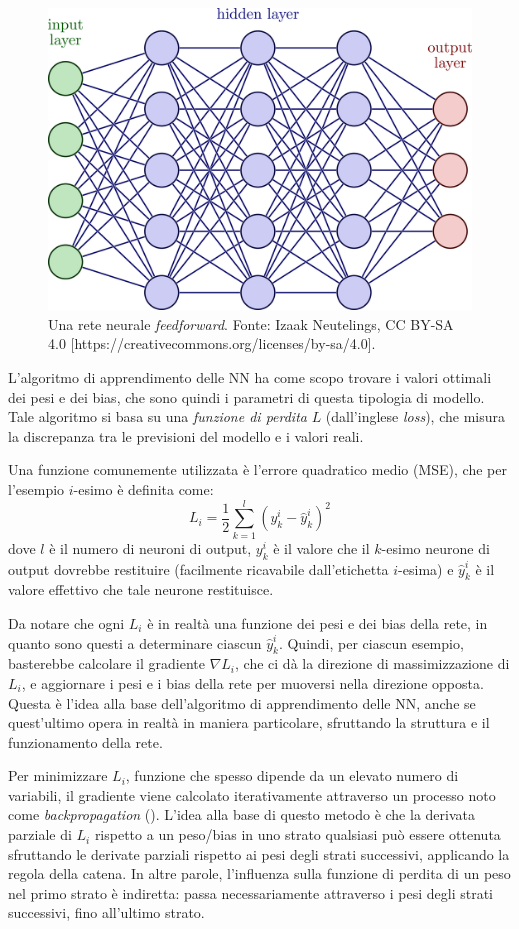 \begin{figure}[h]
    \centering
    \includegraphics[width=0.6\linewidth]{images/neural-net.png}
    \caption{Una rete neurale \textit{feedforward}. Fonte: Izaak Neutelings, CC BY-SA 4.0 [https://creativecommons.org/licenses/by-sa/4.0].}
    \label{fig:neural-net}
\end{figure}

L'algoritmo di apprendimento delle NN ha come scopo trovare i valori ottimali dei pesi e dei bias, che sono quindi i parametri di questa tipologia di modello. Tale algoritmo si basa su una \textit{funzione di perdita} $L$ (dall'inglese \textit{loss}), che misura la discrepanza tra le previsioni del modello e i valori reali.

Una funzione comunemente utilizzata è l'errore quadratico medio (MSE), che per l'esempio $i$-esimo è definita come:
\begin{equation}
    L_i = \frac{1}{2} \sum_{k=1}^l (y_k^i - \hat{y}_k^i)^2
\end{equation}
dove $l$ è il numero di neuroni di output, $y_k^i$ è il valore che il $k$-esimo neurone di output dovrebbe restituire (facilmente ricavabile dall'etichetta $i$-esima) e $\hat{y}_k^i$ è il valore effettivo che tale neurone restituisce.

Da notare che ogni $L_i$ è in realtà una funzione dei pesi e dei bias della rete, in quanto sono questi a determinare ciascun $\hat{y}_k^i$. Quindi, per ciascun esempio, basterebbe calcolare il gradiente $\nabla L_i$, che ci dà la direzione di massimizzazione di $L_i$, e aggiornare i pesi e i bias della rete per muoversi nella direzione opposta. Questa è l'idea alla base dell'algoritmo di apprendimento delle NN, anche se quest'ultimo opera in realtà in maniera particolare, sfruttando la struttura e il funzionamento della rete.

Per minimizzare $L_i$, funzione che spesso dipende da un elevato numero di variabili, il gradiente viene calcolato iterativamente attraverso un processo noto come \textit{backpropagation} (\cite{hinton1986backpropagation}). L'idea alla base di questo metodo è che la derivata parziale di $L_i$ rispetto a un peso/bias in uno strato qualsiasi può essere ottenuta sfruttando le derivate parziali rispetto ai pesi degli strati successivi, applicando la regola della catena. In altre parole, l’influenza sulla funzione di perdita di un peso nel primo strato è indiretta: passa necessariamente attraverso i pesi degli strati successivi, fino all’ultimo strato.

